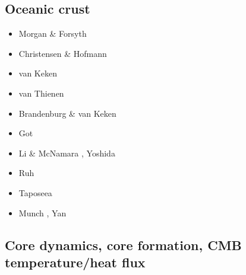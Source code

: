 \subsection{Oceanic crust} 

\begin{scriptsize}
\begin{itemize}
\item[\nineteeneightyeight] Morgan \& Forsyth \cite{mofo88}
\item[\nineteenninetyfour] Christensen \& Hofmann \cite{chho94}
\item[\nineteenninetysix] van Keken \etal \cite{vaky96}
\item[\twothousandfour] van Thienen \etal \cite{vavv04b}
\item[\twothousandseven] Brandenburg \& van Keken \cite{brva07b}
\item[\twothousandeight] Got \etal \cite{gomm08}
\item[\twothousandthirteen] Li \& McNamara \cite{limc13}, Yoshida \cite{yosh13}
\item[\twothousandfifteen] Ruh \etal \cite{rula15}
\item[\twothousandseventeen] Taposeea \etal \cite{taac17}
\item[\twothousandtwenty] Munch \etal \cite{mugu20}, Yan \etal \cite{yabt20}
\end{itemize}
\end{scriptsize}


\subsection{Core dynamics, core formation, CMB temperature/heat flux}

